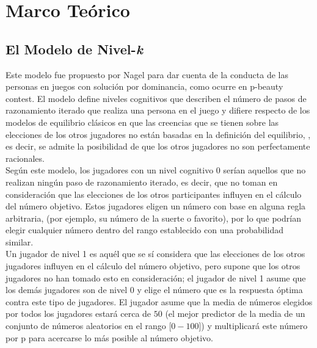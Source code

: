 \chapter{Marco Teórico} %

\label{Cap_Marco} %


\newcommand{\keyword}[1]{\textbf{#1}}
\newcommand{\tabhead}[1]{\textbf{#1}}
\newcommand{\code}[1]{\texttt{#1}}
\newcommand{\file}[1]{\texttt{\bfseries#1}}
\newcommand{\option}[1]{\texttt{\itshape#1}}


\section{El Modelo de Nivel-\textit{k}}

Este modelo fue propuesto por Nagel \parencite*{Nagel1995} para dar cuenta de la conducta de las personas en juegos con solución por dominancia, como ocurre en p-beauty contest. El modelo define niveles cognitivos que describen el número de pasos de razonamiento iterado que realiza una persona en el juego y difiere respecto de los modelos de equilibrio clásicos en que las creencias que se tienen sobre las elecciones de los otros jugadores no están basadas en la definición del equilibrio, \parencite{Crawford2013}, es decir, se admite la posibilidad de que los otros jugadores no son perfectamente racionales.\\

Según este modelo, los jugadores con un nivel cognitivo 0 serían aquellos que no realizan ningún paso de razonamiento iterado, es decir, que no toman en consideración que las elecciones de los otros participantes inﬂuyen en el cálculo del número objetivo. Estos jugadores eligen un número con base en alguna regla arbitraria, (por ejemplo, su número de la suerte o favorito), por lo que podrían elegir cualquier número dentro del rango establecido con una probabilidad similar.\\

Un jugador de nivel 1 es aquél que se sí considera que las elecciones de los otros jugadores influyen en el cálculo del número objetivo, pero supone que los otros jugadores no han tomado esto en consideración; el jugador de nivel 1 asume que los demás jugadores son de nivel 0 y elige el número que es la respuesta óptima contra este tipo de jugadores. El jugador asume que la media de números elegidos por todos los jugadores estará cerca de $50$ (el mejor predictor de la media de un conjunto de números aleatorios en el rango [$0 - 100$]) y multiplicará este número por p para acercarse lo más posible al número objetivo.\\

